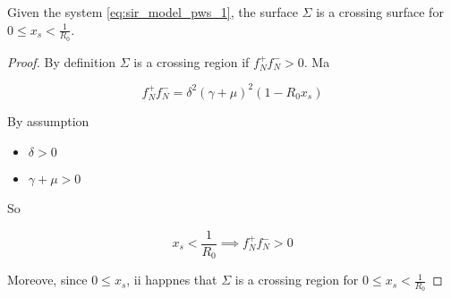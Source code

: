 \begin{lemma}
Given the system \ref{eq:sir_model_pws_1}, the surface $\Sigma$ is a crossing surface for $0 \leq x_s < \frac{1}{R_0}$.
\end{lemma}

\begin{proof}
By definition $\Sigma$ is a crossing region if $f^+_Nf^-_N > 0$. Ma

\begin{equation}
    f^+_Nf^-_N = \delta^2(\gamma + \mu)^2(1- R_0x_s)
\end{equation}

By assumption
\begin{itemize}
    \item $\delta > 0$
    \item $\gamma + \mu > 0$
\end{itemize}

So

\begin{equation}
    x_s < \frac{1}{R_0} \implies f^+_Nf^-_N > 0
\end{equation}

Moreove, since $0 \leq x_s$, ii happnes that $\Sigma$ is a crossing region for $0 \leq x_s < \frac{1}{R_0}$
\end{proof}